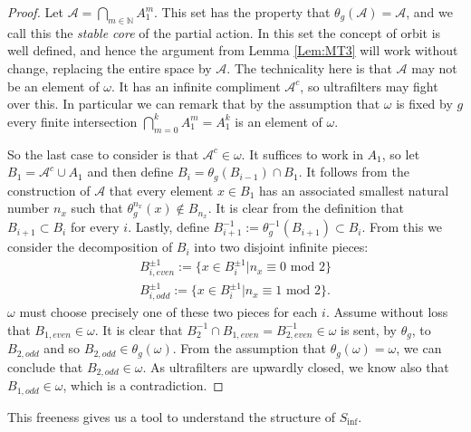 \begin{proof}
Let $\mathcal{A} = \bigcap_{m\in \mathbb{N}} A_{1}^{m}$. This set has the property that $\theta_{g}(\mathcal{A})=\mathcal{A}$, and we call this the \textit{stable core} of the partial action. In this set the concept of orbit is well defined, and hence the argument from Lemma \ref{Lem:MT3} will work without change, replacing the entire space by $\mathcal{A}$. The technicality here is that $\mathcal{A}$ may not be an element of $\omega$. It has an infinite compliment $\mathcal{A}^{c}$, so ultrafilters may fight over this. In particular we can remark that by the assumption that $\omega$ is fixed by $g$ every finite intersection $\bigcap_{m=0}^{k} A_{1}^{m}=A_{1}^{k}$ is an element of $\omega$. 

So the last case to consider is that $\mathcal{A}^{c}\in \omega$. It suffices to work in $A_{1}$, so let $B_{1}=\mathcal{A}^{c}\cup A_{1}$ and then define $B_{i} = \theta_{g}(B_{i-1})\cap B_{1}$. It follows from the construction of $\mathcal{A}$ that every element $x \in B_{1}$ has an associated smallest natural number $n_{x}$ such that $\theta_{g}^{n_{x}}(x) \not \in B_{n_{x}}$. It is clear from the definition that $B_{i+1} \subset B_{i}$ for every $i$. Lastly, define $B^{-1}_{i+1}:=\theta_{g}^{-1}(B_{i+1}) \subset B_{i}$.  From this we consider the decomposition of $B_{i}$ into two disjoint infinite pieces:
\begin{eqnarray*}
B^{\pm 1}_{i,even}:= \lbrace x \in B_{i}^{\pm 1} | n_{x} \equiv 0 \mbox{ mod } 2 \rbrace \\
B^{\pm 1}_{i,odd}:= \lbrace x \in B_{i}^{\pm 1} | n_{x} \equiv 1 \mbox{ mod } 2 \rbrace.
\end{eqnarray*} 
$\omega$ must choose precisely one of these two pieces for each $i$. Assume without loss that $B_{1,even} \in \omega$. It is clear that $B^{-1}_{2} \cap B_{1,even} = B_{2,even}^{-1} \in \omega$ is sent, by $\theta_{g}$, to $B_{2,odd}$ and so $B_{2,odd} \in \theta_{g}(\omega)$. From the assumption that $\theta_{g}(\omega)=\omega$, we can conclude that $B_{2,odd} \in  \omega$. As ultrafilters are upwardly closed, we know also that $B_{1,odd} \in \omega$, which is a contradiction. \end{proof}

This freeness gives us a tool to understand the structure of $S_{\inf}$.


